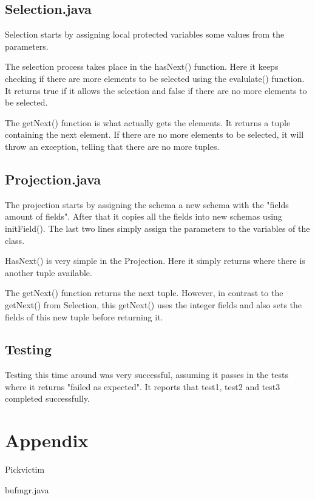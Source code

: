 \documentclass[a4paper,10pt,titlepage]{report}
\begin{document}
\subsection{Selection.java}
Selection starts by assigning local protected variables some values from the parameters. 

The selection process takes place in the hasNext() function. Here it keeps checking if there are more elements to be selected using the evalulate() function. It returns true if it allows the selection and false if there are no more elements to be selected.

The getNext() function is what actually gets the elements. It returns a tuple containing the next element. If there are no more elements to be selected, it will throw an exception, telling that there are no more tuples.

\vspace{10mm}
\subsection{Projection.java}
The projection starts by assigning the schema a new schema with the "fields amount of fields". After that it copies all the fields into new schemas using initField(). The last two lines simply assign the parameters to the variables of the class.

HasNext() is very simple in the Projection. Here it simply returns where there is another tuple available.

The getNext() function returns the next tuple. However, in contrast to the getNext() from Selection, this getNext() uses the integer fields and also sets the fields of this new tuple before returning it. 

\subsection{Testing}
Testing this time around was very successful, assuming it passes in the tests where it returns "failed as expected". It reports that test1, test2 and test3 completed successfully.

\section{Appendix}
Pickvictim


bufmgr.java

\end{document}
